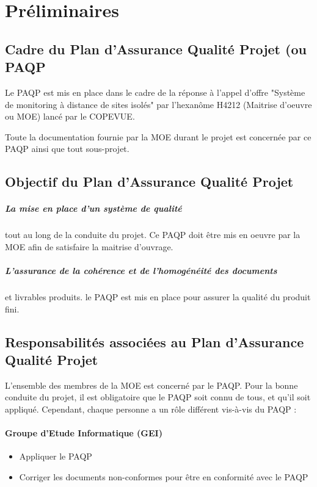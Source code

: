 \section{Préliminaires}
  \subsection{Cadre du Plan d’Assurance Qualité Projet (ou PAQP}
  Le PAQP est mis en place dans le cadre de la réponse à l'appel d'offre "Système de monitoring à distance de sites isolés" par l'hexanôme H4212 (Maitrise d'oeuvre ou MOE) lancé par le COPEVUE.

\par Toute la documentation fournie par la MOE durant le projet est concernée par ce PAQP ainsi que tout sous-projet.

  \subsection{Objectif du Plan d’Assurance Qualité Projet}
    \subparagraph{La mise en place d'un système de qualité} tout au long de la conduite du projet. Ce PAQP doit être mis en oeuvre par la MOE afin de satisfaire la maitrise d'ouvrage.
    \subparagraph{L'assurance de la cohérence et de l'homogénéité des documents} et livrables produits. le PAQP est mis en place pour assurer la qualité du produit fini.

  \subsection{Responsabilités associées au Plan d’Assurance Qualité Projet}                        
L'ensemble des membres de la MOE est concerné par le PAQP. Pour la bonne conduite du projet, il est obligatoire que le PAQP soit connu de tous, et qu'il soit appliqué. Cependant, chaque personne a un rôle différent vis-à-vis du PAQP :

\paragraph{Groupe d'Etude Informatique (GEI)\\}	 
                \begin{itemize}
                \item Appliquer le PAQP
                \item Corriger les documents non-conformes pour être en conformité avec le PAQP
                \end{itemize}

